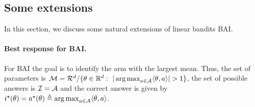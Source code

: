 
\subsection{Some extensions}\label{sec:lgc.complexity.examples}

In this section, we discuss some natural extensions of linear bandits BAI.

\paragraph{Best response for BAI.}\label{sec:lgc.formulation.examples.general}
For BAI the goal is to identify the arm with the largest mean. Thus, the set of parameters is $\cM=\cR^d/\{\theta\in\R^d:\  |\argmax_{a\in\cA} \langle\theta,a\rangle|>1\}$, the set of possible answers is $\mathcal{I} = \mathcal{A}$ and the correct answer is given by $i^\star(\theta)=a^\star(\theta)\triangleq \operatorname*{arg\,max}_{a\in\mathcal{A}} \langle\theta,a\rangle$.


